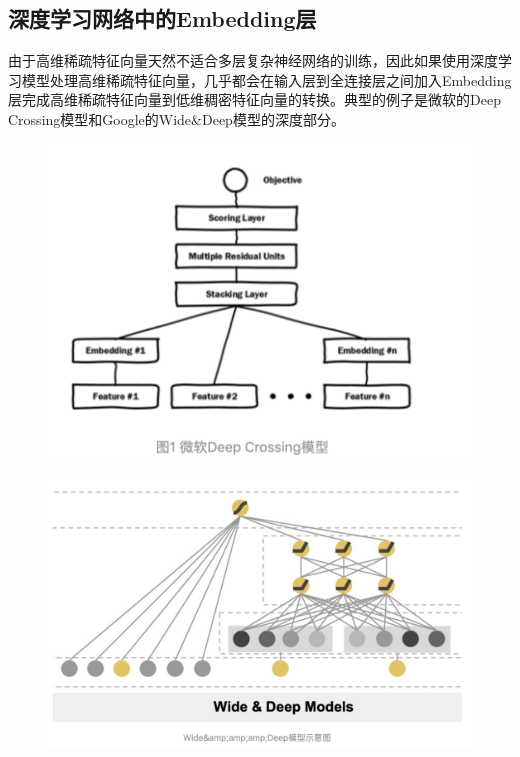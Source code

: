 \documentclass[12pt]{article}
\begin{document}
\subsection{深度学习网络中的Embedding层}
由于高维稀疏特征向量天然不适合多层复杂神经网络的训练，因此如果使用深度学习模型处理高维稀疏特征向量，几乎都会在输入层到全连接层之间加入Embedding层完成高维稀疏特征向量到低维稠密特征向量的转换。典型的例子是微软的Deep Crossing模型和Google的Wide\&Deep模型的深度部分。
\begin{figure}[H]
    \centering
    \includegraphics[width=.8\textwidth]{fig/Microsoft_Deep_Crossing_Strucure.png}
\end{figure}
\begin{figure}[H]
    \centering
    \includegraphics[width=.8\textwidth]{fig/Wide_Deep_Structure.png}
\end{figure}
\end{document}
